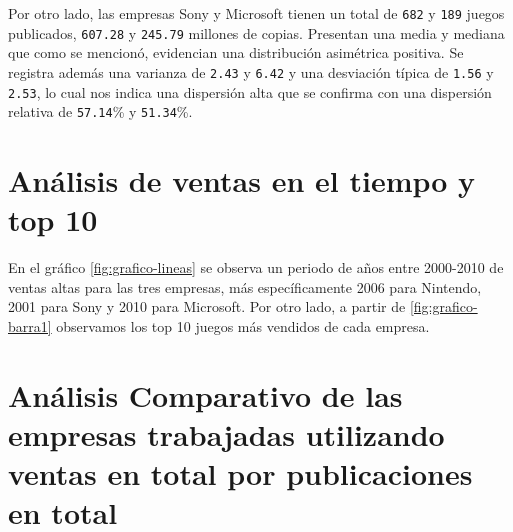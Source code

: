 \documentclass[oneside,11pt]{Latex/Classes/PhDthesisPSnPDF}
\begin{document}
Por otro lado, las empresas Sony y Microsoft tienen un total de
\texttt{682} y \texttt{189} juegos publicados, \texttt{607.28} y
\texttt{245.79} millones de copias. Presentan una media y mediana que
como se mencionó, evidencian una distribución asimétrica positiva. Se
registra además una varianza de \texttt{2.43} y \texttt{6.42} y una
desviación típica de \texttt{1.56} y \texttt{2.53}, lo cual nos indica
una dispersión alta que se confirma con una dispersión relativa de
\texttt{57.14}\% y \texttt{51.34}\%.

\section{ Análisis de ventas en el tiempo y top 10}

En el gráfico \ref{fig:grafico-lineas} se observa un periodo de años
entre 2000-2010 de ventas altas para las tres empresas, más
específicamente 2006 para Nintendo, 2001 para Sony y 2010 para
Microsoft. Por otro lado, a partir de \ref{fig:grafico-barra1}
observamos los top 10 juegos más vendidos de cada empresa.

\section{Análisis Comparativo de las empresas trabajadas utilizando ventas en total por publicaciones en total}
\end{document}
